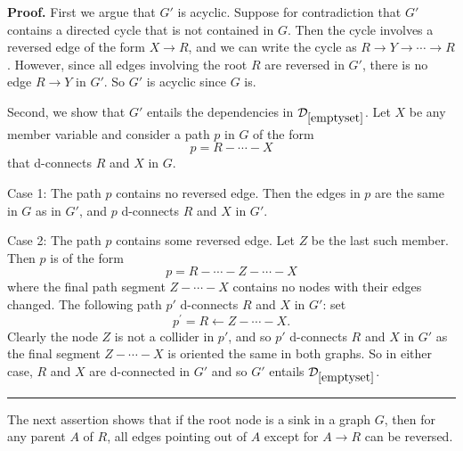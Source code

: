 \documentclass{elsarticle}%
\newtheorem{assertion}[theorem]{Assertion}
\renewenvironment{proof}[1][Proof]{\noindent\textbf{#1.} }{\ \rule{0.5em}{0.5em}}
\newcommand{\ZZ}{\mathbf{Z}}
\newcommand{\A}{A}
\newcommand{\B}{B}
\newcommand{\R}{R}
\newcommand{\X}{X}
\newcommand{\Y}{Y}
\newcommand{\Z}{Z}
\newcommand{\G}{G}
\newcommand{\D}{\mathcal{D}}
\begin{document}
\begin{proof}First we argue that $G'$ is acyclic. Suppose for contradiction
that $G'$ contains a directed cycle %
that is not contained in $G$. Then the cycle involves a reversed edge of the
form $\X \rightarrow R$, and we can write the cycle as $\R \rightarrow
\Y \rightarrow \cdots\rightarrow \R$. However, since all
edges involving the root $\R$ are reversed in $G'$, there is no edge
$\R \rightarrow \Y$ in $G'$. So $G'$ is acyclic since $G$
is.

Second, we show that $G'$ entails the dependencies in $\D_{\ref{emptyset}}$.
Let $X$ be any member variable and consider a path $p$ in $G$ of the form
$$p=R-\cdots-X$$ that d-connects $R$ and $X$ in $G$. 

Case 1: The path $p$ contains no reversed edge. %
Then the edges in $p$ are the
same in $G$ as in $G'$, and $p$ d-connects $R$ and $X$ in $G'$.

Case 2: The path $p$ contains some reversed edge. Let $\Z$ be the last such
member. Then $p$ is of the form $$p=\R-\cdots-\Z-\cdots-\X$$ where the final path
segment $\Z-\cdots-\X$ contains no nodes with their edges changed. The following
path $p'$ d-connects $\R$ and $\X$ in $G'$: set $$p^{\prime
}=\R\leftarrow \Z-\cdots-\X.$$ Clearly the node $\Z$ is not a collider in
$p'$, and so $p'$ d-connects $\R$ and $\X$ in $G' $ as
the final segment $\Z-\cdots-\X$ is oriented the same in both graphs.
So in either case, $\R$ and $\X$ are d-connected in $G'$ and so
$G'$ entails $\D_{\ref{emptyset}}$.
\end{proof}

The next assertion shows that if the root node is a sink in a graph $\G$, then for any parent $\A$ of $\R$, all edges pointing out of $\A$ except for $\A \rightarrow \R$ can be reversed.
\end{document}

